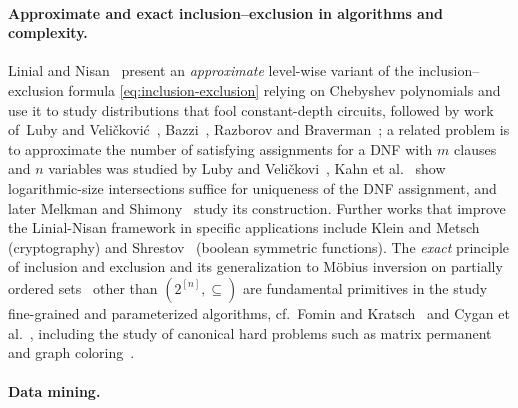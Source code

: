 \documentclass[11pt]{article}
\begin{document}
\paragraph*{Approximate and exact inclusion--exclusion in algorithms and complexity.}

Linial and Nisan~\cite{LinialN1990} present an {\em approximate} level-wise variant of the inclusion--exclusion formula \eqref{eq:inclusion-exclusion} relying on Chebyshev polynomials and use it to study distributions that fool constant-depth circuits, followed by work of~Luby and Veli\v{c}kovi\'c~\cite{luby1991deterministic}, Bazzi~\cite{Bazzi2009}, Razborov \cite{Razborov2009} and Braverman~\cite{Braverman2010}; a related problem is to approximate the number of satisfying assignments for a DNF with $m$ clauses and $n$ variables was studied by Luby and Veli\v{c}kovi~\cite{luby1991deterministic}, Kahn et al.~\cite{KahnLS1996} show logarithmic-size intersections suffice for uniqueness of the DNF assignment, and later Melkman and Shimony~\cite{MelkmanS1997} study its construction. Further works that improve the Linial-Nisan framework in specific applications include Klein and Metsch~\cite{KleinM2007} (cryptography) and Shrestov~\cite{Sherstov2008} (boolean symmetric functions).
The {\em exact} principle of inclusion and exclusion and its generalization
to M\"obius inversion on partially ordered 
sets~\cite{Stanley2012} other than $(2^{[n]},\subseteq)$ 
are fundamental primitives in the study fine-grained and parameterized 
algorithms, cf.~Fomin and Kratsch~\cite{FominK2010}
and Cygan et al.~\cite{CyganFKLMMPS2015}, 
including the study of canonical hard problems such as matrix
permanent~\cite{Ryser1963} and graph coloring~\cite{BjorklundHK2009}.

\paragraph*{Data mining.}
\end{document}
